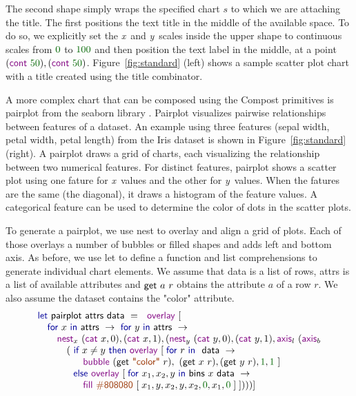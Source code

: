 \documentclass{jfp}
\newcommand{\X}{\emph{x}\ }
\newcommand{\Y}{\emph{y}\ }
\newcommand{\num}[1]{\textcolor{numclr}{#1}}
\newcommand{\str}[1]{\textnormal{\textcolor{strclr}{\sffamily "#1"}}}
\newcommand{\strf}[1]{\textnormal{\textcolor{strclr}{\sffamily #1}}}
\newcommand{\ident}[1]{\textnormal{\textcolor{idclr}{\sffamily #1}}}
\newcommand{\kvd}[1]{\textnormal{\textcolor{kvdclr}{\sffamily #1}}}
\newcommand{\fkvd}[1]{\textnormal{\textcolor{fkvdclr}{\sffamily #1}}}
\begin{document}
The second shape simply wraps the specified chart $s$ to which we are attaching the title. The first
positions the text title in the middle of the available space. To do so, we explicitly set the \X and
\Y scales inside the upper shape to continuous scales from $\num{0}$ to $\num{100}$ and then position
the text label in the middle, at a point $(\kvd{cont}~\num{50}), (\kvd{cont}~\num{50})$.
Figure~\ref{fig:standard} (left) shows a sample scatter plot chart with a title created using the
\ident{title} combinator.

A more complex chart that can be composed using the Compost primitives is pairplot from the seaborn
library \cite{seaborn}. Pairplot visualizes pairwise relationships between features of a dataset.
An example using three features (sepal width, petal width, petal length) from the Iris dataset is shown
in Figure~\ref{fig:standard} (right).
A pairplot draws a grid of charts, each visualizing the relationship between two numerical features. For distinct
features, pairplot shows a scatter plot using one fature for \X values and the other for \Y values.
When the fatures are the same (the diagonal), it draws a histogram of the feature values.
A categorical feature can be used to determine the color of dots in the scatter plots.

To generate a pairplot, we use \kvd{nest} to overlay and align a grid of plots. Each of those
overlays a number of bubbles or filled shapes and adds left and bottom axis. As before, we use
\fkvd{let} to define a function and list comprehensions to generate individual chart elements.
We assume that \ident{data} is a list of rows, \ident{attrs} is a list of available attributes and
$\ident{get}~a~r$ obtains the attribute $a$ of a row $r$. We also assume the dataset contains the \str{color} attribute.
%
\begin{equation*}
\begin{array}{l}
\fkvd{let}~\ident{pairplot}~\ident{attrs}~\ident{data}~=~\kvd{overlay}~[\\
\quad \fkvd{for}~x~\fkvd{in}~\ident{attrs}~\rightarrow~\fkvd{for}~y~\fkvd{in}~\ident{attrs}~\rightarrow\\
\qquad \kvd{nest}_x~(\kvd{cat}~x, 0), (\kvd{cat}~x, 1), (\kvd{nest}_y~(\kvd{cat}~y, 0), (\kvd{cat}~y, 1), \kvd{axis}_l~(\kvd{axis}_b\\
\quad\qquad (~\fkvd{if}~x \neq y~\fkvd{then}~\kvd{overlay}~[\;\fkvd{for}~r~\fkvd{in}~\ident{data}~\rightarrow~\\
\qquad\qquad \hspace{0.7em} \kvd{bubble}~(\ident{get}~\str{color}~r),~(\ident{get}~x~r), (\ident{get}~y~r), \num{1}, \num{1}~]\\
 \quad\qquad \hspace{0.7em} \fkvd{else}~\kvd{overlay}~[\;\fkvd{for}~x_1, x_2, y~\fkvd{in}~\ident{bins}~x~\ident{data}~\rightarrow~\\
\qquad\qquad \hspace{0.7em}  \kvd{fill}~\strf{\#808080}~[\; x_1, y, x_2, y, x_2, \num{0}, x_1, \num {0}\;]\;])))] \\
\end{array}
\end{equation*}
\end{document}
